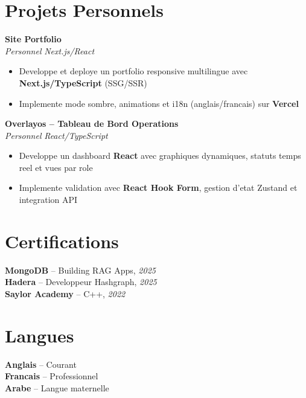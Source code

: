 \documentclass[10pt,a4paper]{article}
\begin{document}
\vspace{4pt}
\section*{Projets Personnels}
{\small
\textbf{Site Portfolio}\\[1pt]
\textit{Personnel} \hfill \textit{Next.js/React}
\begin{itemize}
  \item Developpe et deploye un portfolio responsive multilingue avec \textbf{Next.js/TypeScript} (SSG/SSR)
  \item Implemente mode sombre, animations et i18n (anglais/francais) sur \textbf{Vercel}
\end{itemize}

\vspace{2pt}
\textbf{Overlayos -- Tableau de Bord Operations}\\[1pt]
\textit{Personnel} \hfill \textit{React/TypeScript}
\begin{itemize}
  \item Developpe un dashboard \textbf{React} avec graphiques dynamiques, statuts temps reel et vues par role
  \item Implemente validation avec \textbf{React Hook Form}, gestion d'etat Zustand et integration API
\end{itemize}
}

\vspace{3pt}
\section*{Certifications}
{\small
\textbf{MongoDB} -- Building RAG Apps, \textit{2025}\\[1pt]
\textbf{Hadera} -- Developpeur Hashgraph, \textit{2025}\\[1pt]
\textbf{Saylor Academy} -- C++, \textit{2022}
}

\section*{Langues}
{\small
\textbf{Anglais} -- Courant\\[1pt]
\textbf{Francais} -- Professionnel\\[1pt]
\textbf{Arabe} -- Langue maternelle
}
\end{document}
